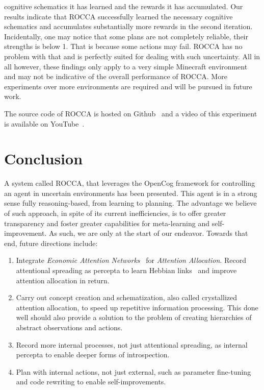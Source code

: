 \documentclass[runningheads]{llncs}
\begin{document}
cognitive schematics it has learned and the rewards it has
accumulated. Our results indicate that ROCCA successfully learned the
necessary cognitive schematics and accumulates substantially more
rewards in the second iteration.  Incidentally, one may notice that
some plans are not completely reliable, their strengths is below 1.
That is because some actions may fail.  ROCCA has no problem with that
and is perfectly suited for dealing with such uncertainty.  All in all
however, these findings only apply to a very simple Minecraft
environment
and may not be indicative of the overall performance of ROCCA.  More
experiments over more environments are required
and will be pursued in future work.

The source code of ROCCA is hosted on Github~\cite{ROCCACode} and a
video of this experiment is available on YouTube~\cite{ROCCADemo}.

\section{Conclusion}
\label{sec:conclusion}
A system called ROCCA, that leverages the OpenCog framework for
controlling an agent in uncertain environments has been presented.
This agent is in a strong sense fully reasoning-based, from learning
to planning.  The advantage we believe of such approach, in spite of
its current inefficiencies, is to offer greater transparency and
foster greater capabilities for meta-learning and self-improvement.
As such, we are only at the start of our endeavor.  Towards that end,
future directions include:
\begin{enumerate}
\item Integrate \emph{Economic Attention Networks}~\cite{Pitt2009} for
  \emph{Attention Allocation}.  Record attentional spreading as
  percepta to learn Hebbian links~\cite{Pitt2009} and improve
  attention allocation in return.
\item Carry out concept creation and schematization, also called
  crystallized attention allocation, to speed up repetitive
  information processing.  This done well should also provide a
  solution to the problem of creating hierarchies of abstract
  observations and actions.
\item Record more internal processes, not just attentional spreading, as
  internal percepta to enable deeper forms of introspection.
\item Plan with internal actions, not just external, such as parameter
  fine-tuning and code rewriting to enable self-improvements.
\end{enumerate}
\end{document}
